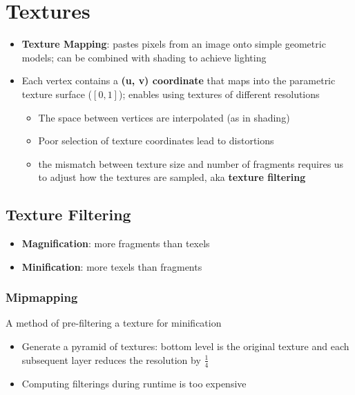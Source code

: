 \chapter{Textures}

\begin{itemize}
  \item \textbf{Texture Mapping}: pastes pixels from an image onto
  simple geometric models; can be combined with shading to achieve lighting
  \item Each vertex contains a \textbf{(u, v) coordinate} that maps into the
  parametric texture surface ($ \left[ 0, 1 \right] $); enables using
  textures of different resolutions
  \begin{itemize}
    \item The space between vertices are interpolated (as in shading)
    \item Poor selection of texture coordinates lead to distortions
    \item the mismatch between texture size and number of fragments requires us
    to adjust how the textures are sampled, aka \textbf{texture filtering}
  \end{itemize}
\end{itemize}

\section{Texture Filtering}

  \begin{itemize}
    \item \textbf{Magnification}: more fragments than texels
    \item \textbf{Minification}: more texels than fragments
  \end{itemize}

  \subsection{Mipmapping}

    A method of pre-filtering a texture for minification

    \begin{itemize}
      \item Generate a pyramid of textures: bottom level is the original
      texture and each subsequent layer reduces the resolution
      by $ \frac{1}{4} $
      \item Computing filterings during runtime is too expensive
    \end{itemize}


